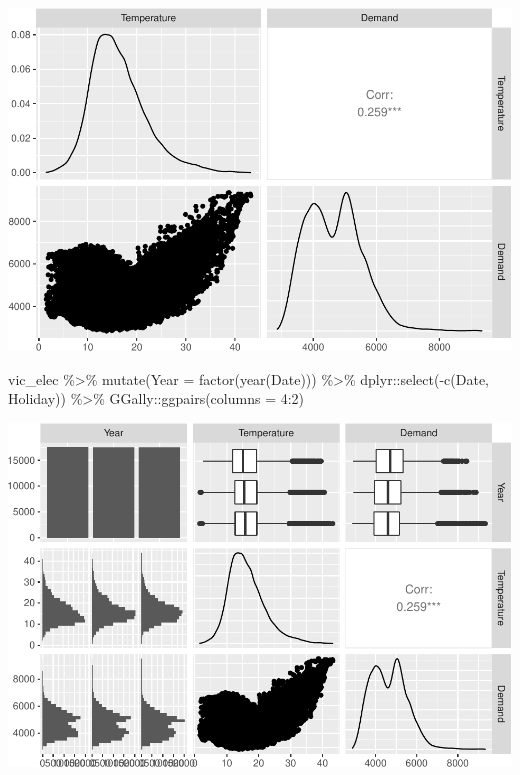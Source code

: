 \documentclass[
]{book}
\newenvironment{Shaded}{\begin{snugshade}}{\end{snugshade}}
\newcommand{\AttributeTok}[1]{\textcolor[rgb]{0.77,0.63,0.00}{#1}}
\newcommand{\DecValTok}[1]{\textcolor[rgb]{0.00,0.00,0.81}{#1}}
\newcommand{\FunctionTok}[1]{\textcolor[rgb]{0.00,0.00,0.00}{#1}}
\newcommand{\NormalTok}[1]{#1}
\newcommand{\SpecialCharTok}[1]{\textcolor[rgb]{0.00,0.00,0.00}{#1}}
\begin{document}
\includegraphics{graphics/unnamed-chunk-21-2.pdf}

\begin{Shaded}
\begin{Highlighting}[]
\NormalTok{vic\_elec }\SpecialCharTok{\%\textgreater{}\%}
  \FunctionTok{mutate}\NormalTok{(}\AttributeTok{Year =} \FunctionTok{factor}\NormalTok{(}\FunctionTok{year}\NormalTok{(Date))) }\SpecialCharTok{\%\textgreater{}\%}
\NormalTok{  dplyr}\SpecialCharTok{::}\FunctionTok{select}\NormalTok{(}\SpecialCharTok{{-}}\FunctionTok{c}\NormalTok{(Date, Holiday)) }\SpecialCharTok{\%\textgreater{}\%}
\NormalTok{  GGally}\SpecialCharTok{::}\FunctionTok{ggpairs}\NormalTok{(}\AttributeTok{columns =} \DecValTok{4}\SpecialCharTok{:}\DecValTok{2}\NormalTok{)}
\end{Highlighting}
\end{Shaded}

\includegraphics{graphics/unnamed-chunk-21-3.pdf}
\end{document}
